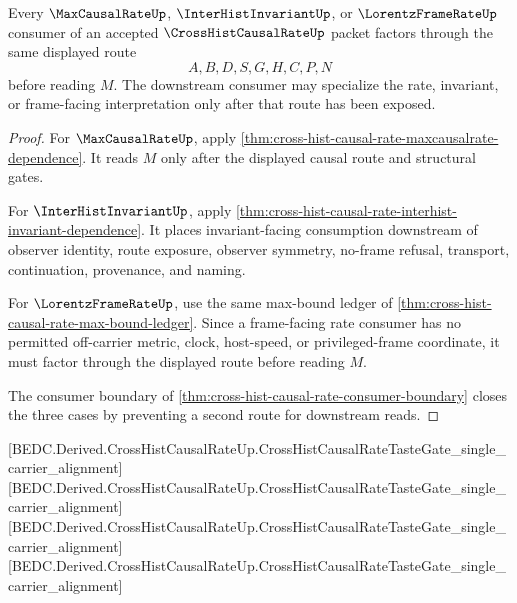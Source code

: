\begin{theorem}
\label{thm:cross-hist-causal-rate-downstream-factorization}
Every $\MaxCausalRateUp$, $\InterHistInvariantUp$, or $\LorentzFrameRateUp$ consumer of an accepted $\CrossHistCausalRateUp$ packet factors through the same displayed route
$$
A,B,D,S,G,H,C,P,N
$$
before reading $M$. The downstream consumer may specialize the rate, invariant, or frame-facing interpretation only after that route has been exposed.
\end{theorem}
\begin{proof}
For $\MaxCausalRateUp$, apply \autoref{thm:cross-hist-causal-rate-maxcausalrate-dependence}. It reads $M$ only after the displayed causal route and structural gates.

For $\InterHistInvariantUp$, apply \autoref{thm:cross-hist-causal-rate-interhist-invariant-dependence}. It places invariant-facing consumption downstream of observer identity, route exposure, observer symmetry, no-frame refusal, transport, continuation, provenance, and naming.

For $\LorentzFrameRateUp$, use the same max-bound ledger of \autoref{thm:cross-hist-causal-rate-max-bound-ledger}. Since a frame-facing rate consumer has no permitted off-carrier metric, clock, host-speed, or privileged-frame coordinate, it must factor through the displayed route before reading $M$.

The consumer boundary of \autoref{thm:cross-hist-causal-rate-consumer-boundary} closes the three cases by preventing a second route for downstream reads.
\end{proof}



[BEDC.Derived.CrossHistCausalRateUp.CrossHistCausalRateTasteGate\_single\_carrier\_alignment]
[BEDC.Derived.CrossHistCausalRateUp.CrossHistCausalRateTasteGate\_single\_carrier\_alignment]
[BEDC.Derived.CrossHistCausalRateUp.CrossHistCausalRateTasteGate\_single\_carrier\_alignment]
[BEDC.Derived.CrossHistCausalRateUp.CrossHistCausalRateTasteGate\_single\_carrier\_alignment]

